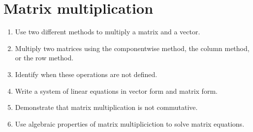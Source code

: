\section{Matrix multiplication}

\begin{outcome}
  \begin{enumerate}
  \item Use two different methods to multiply a matrix and a vector.
  \item Multiply two matrices using the componentwise method, the
    column method, or the row method.
  \item Identify when these operations are not defined.
  \item Write a system of linear equations in vector form and matrix form.
  \item Demonstrate that matrix multiplication is not commutative.
  \item Use algebraic properties of matrix multipliciction to
    solve matrix equations.
  \end{enumerate}
\end{outcome}


